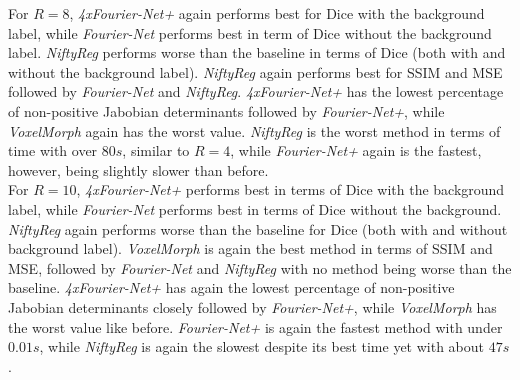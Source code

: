 \documentclass[english,version-2022-01]{uzl-thesis} %
\begin{document}
For $R=8$, \emph{4xFourier-Net+} again performs best for Dice with the background label, while \emph{Fourier-Net} performs best in term of Dice without the background label. \emph{NiftyReg} performs worse than the baseline in terms of Dice (both with and without the background label). \emph{NiftyReg} again performs best for SSIM and MSE followed by \emph{Fourier-Net} and \emph{NiftyReg}. \emph{4xFourier-Net+} has the lowest percentage of non-positive Jabobian determinants followed by \emph{Fourier-Net+}, while \emph{VoxelMorph} again has the worst value. \emph{NiftyReg} is the worst method in terms of time with over $80s$, similar to $R=4$, while \emph{Fourier-Net+} again is the fastest, however, being slightly slower than before.\\
For $R=10$, \emph{4xFourier-Net+} performs best in terms of Dice with the background label, while \emph{Fourier-Net} performs best in terms of Dice without the background. \emph{NiftyReg} again performs worse than the baseline for Dice (both with and without background label). \emph{VoxelMorph} is again the best method in terms of SSIM and MSE, followed by \emph{Fourier-Net} and \emph{NiftyReg} with no method being worse than the baseline. \emph{4xFourier-Net+} has again the lowest percentage of non-positive Jabobian determinants closely followed by \emph{Fourier-Net+}, while \emph{VoxelMorph} has the worst value like before. \emph{Fourier-Net+} is again the fastest method with under $0.01s$, while \emph{NiftyReg} is again the slowest despite its best time yet with about $47s$.
\end{document}
